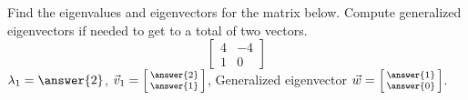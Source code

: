 \documentclass{ximera}
\begin{document}
\begin{exercise}%
    Find the eigenvalues and eigenvectors for the matrix below. Compute generalized eigenvectors if needed to get to a total of two vectors. 
    \[ 
    \begin{bmatrix} 
    4 & -4 \\ 
    1 & 0 
    \end{bmatrix} 
    \]
    $\lambda_1 = \answer{2}$, $\vec{v}_1 = \left[\begin{smallmatrix} \answer{2} \\ \answer{1} \end{smallmatrix}\right]$, Generalized eigenvector $\vec{w} = \left[\begin{smallmatrix} \answer{1} \\ \answer{0} \end{smallmatrix}\right]$.  
\end{exercise}
\end{document}
